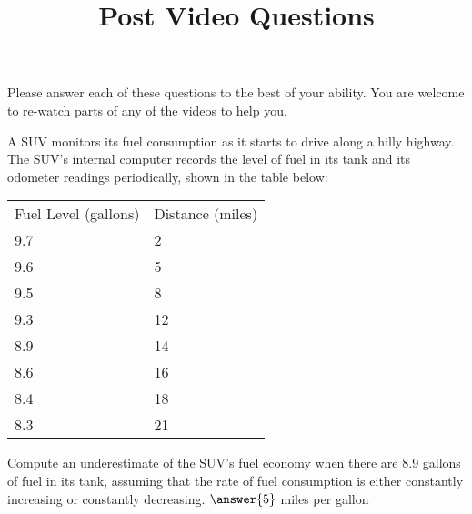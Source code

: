\documentclass[handout]{ximera}
\title{Post Video Questions}
\begin{document}
\begin{abstract}
\end{abstract}


\maketitle

Please answer each of these questions to the best of your ability. You are welcome to re-watch parts of any of the videos to help you.

\begin{problem}
A SUV monitors its fuel consumption as it starts to drive along a hilly highway. The SUV’s internal computer records the level of fuel in its tank and its odometer readings periodically, shown in the table below:
\begin{table}[h!]
\centering
\begin{tabular}{ll}
\hline
Fuel Level (gallons) & Distance (miles) \\
9.7                  & 2                \\
9.6                  & 5                \\
9.5                  & 8                \\
9.3                  & 12               \\
8.9                  & 14               \\
8.6                  & 16               \\
8.4                  & 18               \\
8.3                  & 21               \\
\end{tabular}
\end{table}

Compute an underestimate of the SUV’s fuel economy when there are 8.9 gallons of fuel in its tank, assuming that the rate of fuel consumption is either constantly increasing or constantly decreasing.
$\answer{5}$ miles per gallon



\end{problem}
\end{document}
